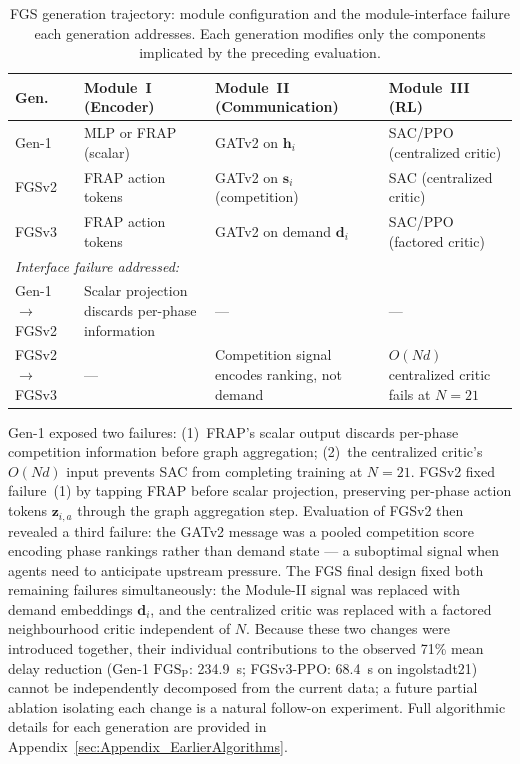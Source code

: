 \begin{table}[ht]
\centering
\caption{FGS generation trajectory: module configuration and the module-interface failure each generation addresses. Each generation modifies only the components implicated by the preceding evaluation.}
\label{tab:fgs_generation_summary}
\small
\setlength{\tabcolsep}{5pt}
\renewcommand{\arraystretch}{1.2}
\begin{tabular}{lp{2.9cm}p{3.4cm}p{3.8cm}}
\toprule
\textbf{Gen.} & \textbf{Module~I (Encoder)} & \textbf{Module~II (Communication)} & \textbf{Module~III (RL)} \\
\midrule
Gen-1   & MLP or FRAP (scalar)      & GATv2 on $\mathbf{h}_i$                & SAC/PPO (centralized critic) \\
FGSv2   & FRAP action tokens        & GATv2 on $\mathbf{s}_i$ (competition)  & SAC (centralized critic)     \\
FGSv3   & FRAP action tokens        & GATv2 on demand $\mathbf{d}_i$         & SAC/PPO (factored critic)    \\
\midrule
\multicolumn{4}{l}{\textit{Interface failure addressed:}} \\
Gen-1$\to$FGSv2  & Scalar projection discards per-phase information & ---                                & ---                                          \\
FGSv2$\to$FGSv3  & ---                                              & Competition signal encodes ranking, not demand & $O(Nd)$ centralized critic fails at $N=21$ \\
\bottomrule
\end{tabular}
\end{table}

Gen-1 exposed two failures: (1)~FRAP's scalar output discards per-phase competition information before graph aggregation; (2)~the centralized critic's $O(Nd)$ input prevents SAC from completing training at $N=21$. FGSv2 fixed failure~(1) by tapping FRAP before scalar projection, preserving per-phase action tokens $\mathbf{z}_{i,a}$ through the graph aggregation step. Evaluation of FGSv2 then revealed a third failure: the GATv2 message was a pooled competition score encoding phase rankings rather than demand state --- a suboptimal signal when agents need to anticipate upstream pressure. The FGS final design fixed both remaining failures simultaneously: the Module-II signal was replaced with demand embeddings $\mathbf{d}_i$, and the centralized critic was replaced with a factored neighbourhood critic independent of $N$. Because these two changes were introduced together, their individual contributions to the observed 71\% mean delay reduction (Gen-1 $\text{FGS}_\text{P}$: 234.9~s; FGSv3-PPO: 68.4~s on ingolstadt21) cannot be independently decomposed from the current data; a future partial ablation isolating each change is a natural follow-on experiment. Full algorithmic details for each generation are provided in Appendix~\ref{sec:Appendix_EarlierAlgorithms}.

